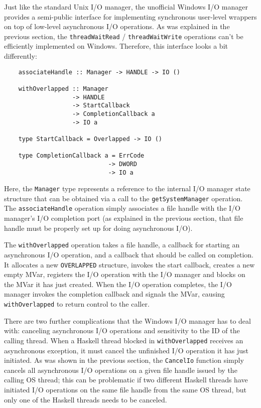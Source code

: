 \documentclass[a4paper,11pt,oneside]{report}
\begin{document}
Just like the standard Unix I/O manager, the unofficial Windows I/O manager
provides a semi-public interface for implementing synchronous user-level
wrappers on top of low-level asynchronous I/O operations. As was explained in
the previous section, the \texttt{threadWaitRead} / \texttt{threadWaitWrite}
operations can't be efficiently implemented on Windows. Therefore, this
interface looks a bit differently:

\begin{verbatim}
    associateHandle :: Manager -> HANDLE -> IO ()

    withOverlapped :: Manager
                   -> HANDLE
                   -> StartCallback
                   -> CompletionCallback a
                   -> IO a

    type StartCallback = Overlapped -> IO ()

    type CompletionCallback a = ErrCode
                             -> DWORD
                             -> IO a
\end{verbatim}

Here, the \texttt{Manager} type represents a reference to the internal I/O
manager state structure that can be obtained via a call to the
\texttt{getSystemManager} operation. The \texttt{associateHandle} operation
simply associates a file handle with the I/O manager's I/O completion port
(as explained in the previous section, that file handle must be properly set
up for doing asynchronous I/O).

The \texttt{withOverlapped} operation takes a file handle, a callback for
starting an asynchronous I/O operation, and a callback that should be called on
completion. It allocates a new \texttt{OVERLAPPED} structure, invokes the start
callback, creates a new empty MVar, registers the I/O operation with the I/O
manager and blocks on the MVar it has just created. When the I/O operation
completes, the I/O manager invokes the completion callback and signals the MVar,
causing \texttt{withOverlapped} to return control to the caller.

There are two further complications that the Windows I/O manager has to deal
with: canceling asynchronous I/O operations and sensitivity to the ID of the
calling thread. When a Haskell thread blocked in \texttt{withOverlapped}
receives an asynchronous exception, it must cancel the unfinished I/O operation
it has just initiated. As was shown in the previous section, the
\texttt{CancelIo} function simply cancels all asynchronous I/O operations on a
given file handle issued by the calling OS thread; this can be problematic
if two different Haskell threads have initiated I/O operations on the same file
handle from the same OS thread, but only one of the Haskell threads needs to
be canceled.
\end{document}
